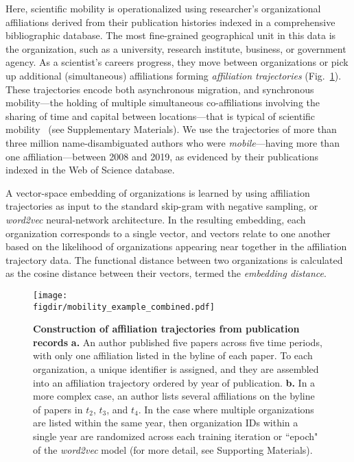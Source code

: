 \documentclass[12pt]{article} %
\def\figdir{../Figs}
\begin{document}
Here, scientific mobility is operationalized using researcher's organizational affiliations derived from their publication histories indexed in a comprehensive bibliographic database. 
The most fine-grained geographical unit in this data is the organization, such as a university, research institute, business, or government agency.
As a scientist's careers progress, they move between organizations or pick up additional (simultaneous) affiliations forming \textit{affiliation trajectories} (Fig.~\ref{fig:methods:mobility_sentence}).
These trajectories encode both asynchronous migration, and synchronous mobility---the holding of multiple simultaneous co-affiliations involving the sharing of time and capital between locations---that is typical of scientific mobility~\autocite{rodrigues2016mobility, markova2016synchronous, sugimoto2017mostimpact} (see Supplementary Materials).
We use the trajectories of more than three million name-disambiguated authors who were \textit{mobile}---having more than one affiliation---between 2008 and 2019, as evidenced by their publications indexed in the Web of Science database.


A vector-space embedding of organizations is learned by using affiliation trajectories as input to the standard skip-gram with negative sampling, or \textit{word2vec} neural-network architecture.
In the resulting embedding, each organization corresponds to a single vector, and vectors relate to one another based on the likelihood of organizations appearing near together in the affiliation trajectory data. 
The functional distance between two organizations is calculated as the cosine distance between their vectors, termed the \textit{embedding distance}.

%
%
\begin{figure}[ht!]
    \centering
    \texttt{[image: \\figdir/mobility\_example\_combined.pdf]}
    \caption{
        \textbf{Construction of affiliation trajectories from publication records}
        \textbf{a.}
        An author published five papers across five time periods, with only one affiliation listed in the byline of each paper.
        To each organization, a unique identifier is assigned, and they are assembled into an affiliation trajectory ordered by year of publication.
        \textbf{b.}
        In a more complex case, an author lists several affiliations on the byline of papers in $t_{2}$, $t_{3}$, and $t_{4}$. 
        In the case where multiple organizations are listed within the same year, then organization IDs within a single year are randomized across each training iteration or ``epoch" of the \textit{word2vec} model (for more detail, see Supporting Materials). 
    }
    \label{fig:methods:mobility_sentence}
\end{figure}
\end{document}
